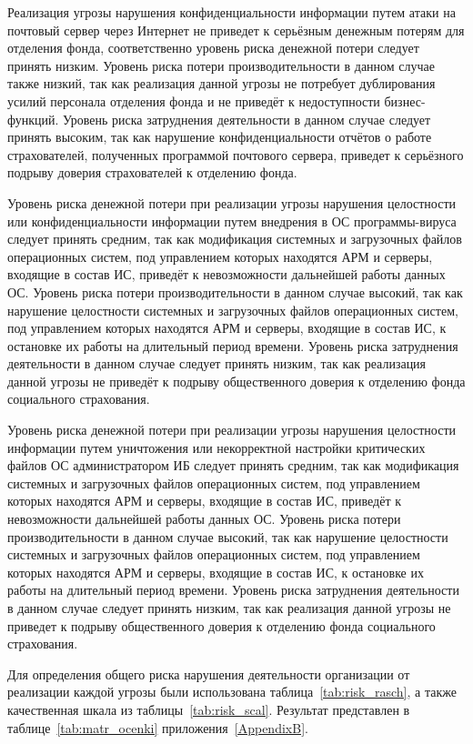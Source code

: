 \point Реализация угрозы нарушения конфиденциальности информации путем
атаки на почтовый сервер через Интернет не приведет к серьёзным
денежным потерям для отделения фонда, соответственно уровень риска
денежной потери следует принять низким. Уровень риска потери
производительности в данном случае также низкий, так как реализация
данной угрозы не потребует дублирования усилий персонала отделения
фонда и не приведёт к недоступности бизнес-функций. Уровень риска
затруднения деятельности в данном случае следует принять высоким, так
как нарушение конфиденциальности отчётов о работе страхователей,
полученных программой почтового сервера, приведет к серьёзного подрыву
доверия страхователей к отделению фонда.

\point Уровень риска денежной потери при реализации угрозы нарушения
целостности или конфиденциальности информации путем внедрения в ОС
программы-вируса следует принять средним, так как модификация
системных и загрузочных файлов операционных систем, под управлением
которых находятся АРМ и серверы, входящие в состав ИС, приведёт к
невозможности дальнейшей работы данных ОС. Уровень риска потери
производительности в данном случае высокий, так как нарушение
целостности системных и загрузочных файлов операционных систем, под
управлением которых находятся АРМ и серверы, входящие в состав ИС, к
остановке их работы на длительный период времени. Уровень риска
затруднения деятельности в данном случае следует принять низким, так
как реализация данной угрозы не приведёт к подрыву общественного
доверия к отделению фонда социального страхования.

\point Уровень риска денежной потери при реализации угрозы нарушения
целостности информации путем уничтожения или некорректной настройки
критических файлов ОС администратором ИБ следует принять средним, так
как модификация системных и загрузочных файлов операционных систем,
под управлением которых находятся АРМ и серверы, входящие в состав ИС,
приведёт к невозможности дальнейшей работы данных ОС. Уровень риска
потери производительности в данном случае высокий, так как нарушение
целостности системных и загрузочных файлов операционных систем, под
управлением которых находятся АРМ и серверы, входящие в состав ИС, к
остановке их работы на длительный период времени. Уровень риска
затруднения деятельности в данном случае следует принять низким, так
как реализация данной угрозы не приведет к подрыву общественного
доверия к отделению фонда социального страхования.

\point Для определения общего риска нарушения деятельности организации
от реализации каждой угрозы были использована
таблица~\ref{tab:risk_rasch}, а также качественная шкала из
таблицы~\ref{tab:risk_scal}. Результат представлен в
таблице~\ref{tab:matr_ocenki} приложения~\ref{AppendixB}.

